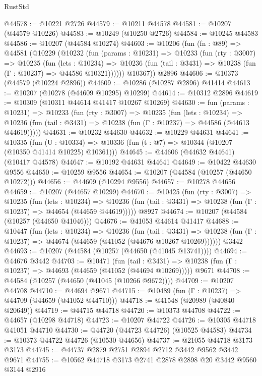 \begin{lexlean}{RustStd}
\begin{coremodule}
@44578 := @10221 @2726
@44579 := @10211 @44578
@44581 := @10207 (@44579 @10226)
@44583 := @10249 (@10250 @2726)
@44584 := @10245 @44583
@44586 := @10207 (@44584 @10274)
@44603 := @10206
    (fun (fn : @89) =>
    @44581
      (@10229
        (@10232
          (fun (params : @10231) =>
          @10233
            (fun (rty : @3007) =>
            @10235
              (fun (lets : @10234) =>
              @10236 (fun (tail : @3431) => @10238 (fun (Γ : @10237) => @44586 @10321))))))
        @10367))
    @2896
@44606 := @10373 (@44579 (@10224 @2896))
@44609 := @10286 (@10287 @2896) @41414
@44613 := @10207 (@10278 (@44609 @10295) @10299)
@44614 := @10312 @2896
@44619 := @10309 (@10311 @44614 @41417 @10267 @10269)
@44630 := fun (params : @10231) =>
  @10233
    (fun (rty : @3007) =>
    @10235
      (fun (lets : @10234) =>
      @10236 (fun (tail : @3431) => @10238 (fun (Γ : @10237) => @44586 (@44613 @44619)))))
@44631 := @10232 @44630
@44632 := @10229 @44631
@44641 := @10335
    (fun (U : @10334) => @10336 (fun (t : @7) => @10344 (@10207 (@10350 @41414 @10225) @10361)))
@44645 := @44606 (@44632 @44641) (@10417 @44578)
@44647 := @10192 @44631 @44641
@44649 := @10422 @44630 @9556
@44650 := @10259 @9556
@44654 := @10207 (@44584 (@10257 (@44650 @10272)))
@44656 := @44609 (@10294 @9556)
@44657 := @10278 @44656
@44659 := @10207 (@44657 @10299)
@44670 := @10425
    (fun (rty : @3007) =>
    @10235
      (fun (lets : @10234) =>
      @10236 (fun (tail : @3431) => @10238 (fun (Γ : @10237) => @44654 (@44659 @44619)))))
    @8927
@44674 := @10207 (@44584 (@10257 (@44650 @41046)))
@44676 := @41053 @44614 @41417
@44688 := @10447
    (fun (lets : @10234) =>
    @10236
      (fun (tail : @3431) =>
      @10238 (fun (Γ : @10237) => @44674 (@44659 (@41052 (@44676 @10267 @10269))))))
    @3442
@44693 := @10207 (@44584 (@10257 (@44650 (@41045 @13741))))
@44694 := @44676 @3442
@44703 := @10471
    (fun (tail : @3431) => @10238 (fun (Γ : @10237) => @44693 (@44659 (@41052 (@44694 @10269)))))
    @9671
@44708 := @44584 (@10257 (@44650 (@41045 (@10266 @9672))))
@44709 := @10207 @44708
@44710 := @44694 @9671
@44715 := @10489 (fun (Γ : @10237) => @44709 (@44659 (@41052 @44710)))
@44718 := @41548 (@20989 (@40840 @20649))
@44719 := @44715 @44718
@44720 := @10373 @44708
@44722 := @44657 (@10298 @44718)
@44723 := @10207 @44722
@44726 := @10305 @44718 @41051 @44710
@44730 := @44720 (@44723 @44726) (@10525 @44583)
@44734 := @10373 @44722 @44726 (@10530 @44656)
@44737 := @21055 @44718 @3173 @3173
@44745 := @44737 @2879 @2751 @2894 @2712 @3442 @9562 @3442 @9671
@44755 := @10562 @44718 @3173 @2741 @2878 @2898 @20 @3442 @9560 @3144 @2916

\end{coremodule}
\end{lexlean}
